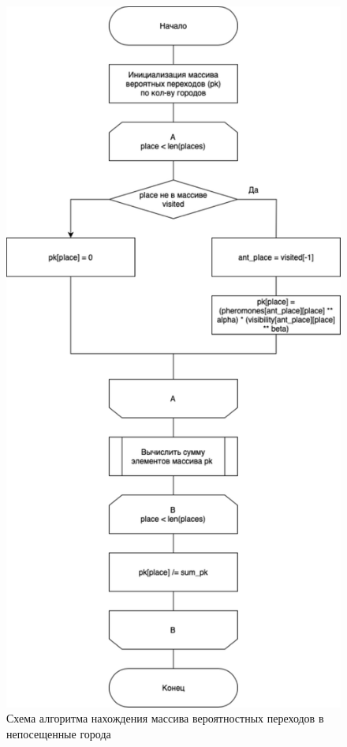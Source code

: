 \begin{figure}[h]
    \centering
    \includegraphics[width=0.60\linewidth]{img/find.pdf}
    \caption{Схема алгоритма нахождения массива вероятностных переходов в непосещенные города}
    \label{img:find}
\end{figure}
\noindent

